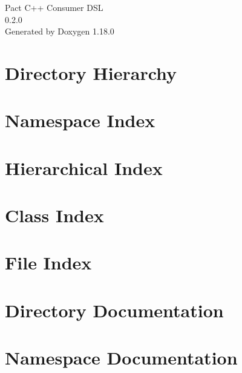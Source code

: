 \documentclass[twoside]{book}
\newcommand{\+}{\discretionary{\mbox{\scriptsize$\hookleftarrow$}}{}{}}
\newcommand{\clearemptydoublepage}{%
    \newpage{\pagestyle{empty}\cleardoublepage}%
  }
\begin{document}
  \raggedbottom
    \hypersetup{pageanchor=false,
                bookmarksnumbered=true,
                pdfencoding=unicode
               }
  \begin{titlepage}
  \vspace*{7cm}
  \begin{center}%
  {\Large Pact C++ Consumer DSL}\\
  [1ex]\large 0.\+2.\+0 \\
  \vspace*{1cm}
  {\large Generated by Doxygen 1.18.0}\\
  \end{center}
  \end{titlepage}
  \clearemptydoublepage
  \tableofcontents
  \clearemptydoublepage
  \hypersetup{pageanchor=true}
\chapter{Directory Hierarchy}

\chapter{Namespace Index}

\chapter{Hierarchical Index}

\chapter{Class Index}

\chapter{File Index}

\chapter{Directory Documentation}


\chapter{Namespace Documentation}


\end{document}
